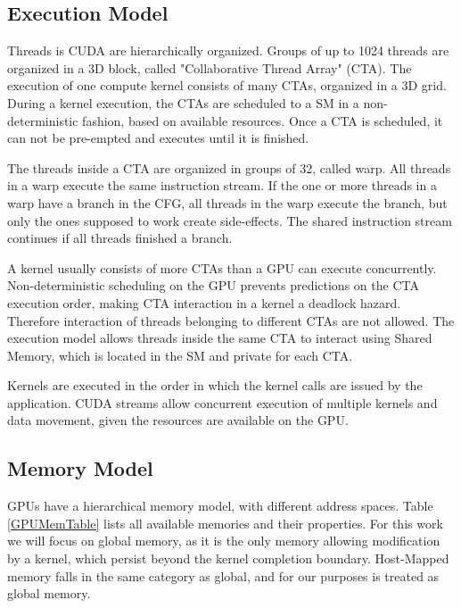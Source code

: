 \subsection{Execution Model}
Threads is CUDA are hierarchically organized. Groups of up to 1024 threads are organized in a 3D block, called "Collaborative Thread Array" (CTA). The execution of one compute kernel consists of many CTAs, organized in a 3D grid. During a kernel execution, the CTAs are  scheduled to a SM in a non-deterministic fashion, based on available resources. Once a CTA is scheduled, it can not be pre-empted and executes until it is finished.  \cite[2.1 - 2.2]{cuda-man}

The threads inside a CTA are organized in groups of 32, called warp. All threads in a warp execute the same instruction stream. If the one or more threads in a warp have a branch in the CFG, all threads in the warp
execute the branch, but only the ones supposed to work create side-effects. The shared instruction stream continues if all threads finished a branch. \cite[4.1]{cuda-man}

A kernel usually consists of more CTAs than a GPU can execute concurrently. Non-deterministic scheduling on the GPU  prevents predictions on the CTA execution order, making CTA interaction
in a kernel a deadlock hazard. Therefore interaction of threads belonging to different CTAs are not allowed. The execution model allows threads inside the same CTA to interact using Shared Memory, which is located in the SM and private for each CTA. \cite[5]{cuda-man}

Kernels are executed in the order in which the kernel calls are issued by the application. CUDA streams allow concurrent  execution of multiple kernels and data movement, given the resources are available on the GPU. \cite[5]{cuda-man}

\subsection{Memory Model}
GPUs have a hierarchical memory model, with different address spaces. Table \ref{GPUMemTable} lists all available memories and their properties. For this work we will focus on global memory, as it is the only 
memory allowing modification by a kernel, which persist beyond the kernel completion boundary.
Host-Mapped memory falls in the same category as global, and for our purposes is treated as global memory. 

